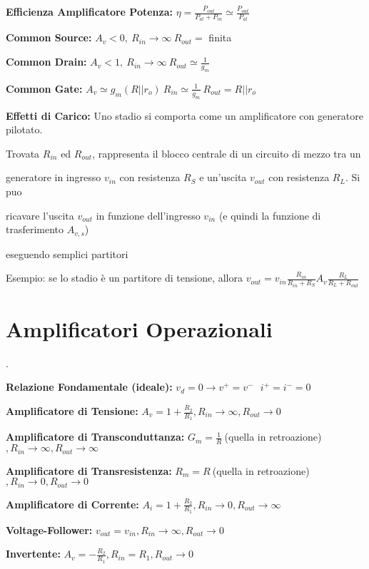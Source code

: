 \documentclass[12pt]{extarticle}
\begin{document}
{\bf Efficienza Amplificatore Potenza:} $\displaystyle \eta = \frac{P_{out}}{P_{al}+P_{in}} \simeq \frac{P_{out}}{P_{al}}$ 

{\bf Common Source:} $ A_v < 0, \ R_{in} \to \infty \ R_{out} = $ finita 

{\bf Common Drain:} $ A_v < 1, \ R_{in} \to \infty \ R_{out} \simeq \frac{1}{g_m}$	

{\bf Common Gate:} $ A_v \simeq g_m(R || r_o) \ R_{in} \simeq \frac{1}{g_m} \ R_{out} = R || r_o$

{\bf Effetti di Carico:} Uno stadio si comporta come un amplificatore con generatore pilotato.

Trovata $R_{in}$ ed $R_{out}$, rappresenta il blocco centrale di un circuito di mezzo tra un 

generatore in ingresso $v_{in}$ con resistenza $R_S$ e un'uscita $v_{out}$ con resistenza $R_L$. Si puo

ricavare l'uscita $v_{out}$ in funzione dell'ingresso $v_{in}$ (e quindi la funzione di trasferimento $A_{v,s}$)

eseguendo semplici partitori 

Esempio: se lo stadio è un partitore di tensione, allora $\displaystyle v_{out} = v_{in}\frac{R_{in}}{R_{in}+R_S}A_v\frac{R_L}{R_L+R_{out}}$


\section{Amplificatori Operazionali}.

{\bf Relazione Fondamentale (ideale):} $\displaystyle v_d = 0 \to v^+ = v^- \ \ \ i^+ = i^- = 0$

{\bf Amplificatore di Tensione:} $\displaystyle A_v = 1+\frac{R_2}{R_1}, R_{in} \to \infty, R_{out} \to 0$

{\bf Amplificatore di Transconduttanza:} $\displaystyle G_m = \frac{1}{R} \ $(quella in retroazione)$, R_{in} \to \infty, R_{out} \to \infty$

{\bf Amplificatore di Transresistenza: } $\displaystyle R_m = R \ $(quella in retroazione)$, R_{in} \to 0, R_{out} \to 0$

{\bf Amplificatore di Corrente:} $\displaystyle A_i = 1+\frac{R_2}{R_1}, R_{in} \to 0, R_{out} \to \infty$

{\bf Voltage-Follower:} $\displaystyle v_{out} = v_{in}, R_{in} \to \infty, R_{out} \to 0$

{\bf Invertente:} $\displaystyle A_v = -\frac{R_2}{R_1}, R_{in} = R_1, R_{out} \to 0$
\end{document}
